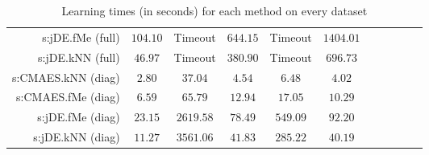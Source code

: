 \begin{table}[ht]
{\begin{tabular}{rcccccccccc}
s:jDE.fMe (full) & $104.10$ & Timeout  & $644.15$ & Timeout  & $1404.01$ \\
s:jDE.kNN (full) & $46.97$ & Timeout  & $380.90$ & Timeout  & $696.73$ \\
s:CMAES.kNN (diag) & $2.80$ & $37.04$ & $4.54$ & $6.48$ & $4.02$ \\
s:CMAES.fMe (diag) & $6.59$ & $65.79$ & $12.94$ & $17.05$ & $10.29$ \\
s:jDE.fMe (diag) & $23.15$ & $2619.58$ & $78.49$ & $549.09$ & $92.20$ \\
s:jDE.kNN (diag) & $11.27$ & $3561.06$ & $41.83$ & $285.22$ & $40.19$ \\


\bottomrule
\end{tabular}
}
\caption{Learning times (in seconds) for each method on every dataset} \label{tab:learning-times}
\end{table}
